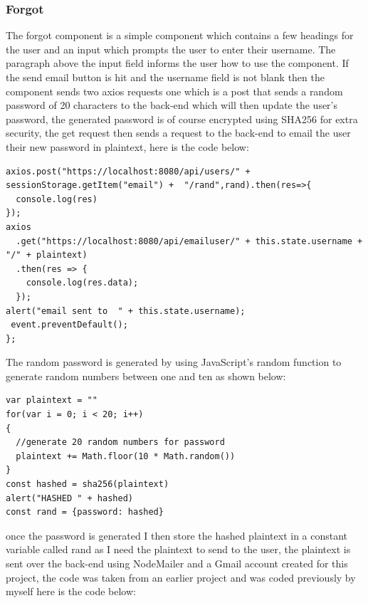 \subsubsection{Forgot}
The forgot component is a simple component which contains a few headings for the user and an input which prompts the user to enter their username.  The paragraph above the input field informs the user how to use the component.  If the send email button is hit and the username field is not blank then the component sends two axios requests one which is a post that sends a random password of 20 characters to the back-end which will then update the user's password, the generated password is of course encrypted using SHA256 for extra security, the get request then sends a request to the back-end to email the user their new password in plaintext, here is the code below:
\begin{verbatim}
axios.post("https://localhost:8080/api/users/" + sessionStorage.getItem("email") +  "/rand",rand).then(res=>{
  console.log(res)
});
axios
  .get("https://localhost:8080/api/emailuser/" + this.state.username + "/" + plaintext)
  .then(res => {
    console.log(res.data);
  });
alert("email sent to  " + this.state.username);
 event.preventDefault();
};
\end{verbatim}
The random password is generated by using JavaScript's random function to generate random numbers between one and ten as shown below:
\begin{verbatim}
var plaintext = ""
for(var i = 0; i < 20; i++)
{
  //generate 20 random numbers for password
  plaintext += Math.floor(10 * Math.random())
}
const hashed = sha256(plaintext)
alert("HASHED " + hashed)
const rand = {password: hashed}
\end{verbatim}
once the password is generated I then store the hashed plaintext in a constant variable called rand as I need the plaintext to send to the user, the plaintext is sent over the back-end using NodeMailer and a Gmail account created for this project, the code was taken from an earlier project and was coded previously by myself here is the code below:

